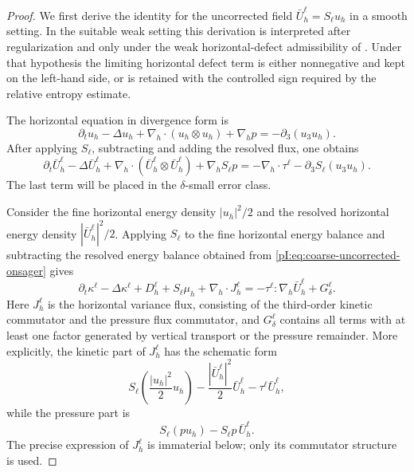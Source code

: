 \documentclass[11pt]{article}
\numberwithin{equation}{section}
\theoremstyle{plain}
\theoremstyle{definition}
\theoremstyle{remark}
\newcommand{\nabh}{\nabla_h}
\newcommand{\divh}{\nabla_h\!\cdot}
\begin{document}
\begin{proof}
We first derive the identity for the uncorrected field \(\bar U_h^\ell=S_\ell u_h\) in a smooth setting.  In the suitable weak setting this derivation is interpreted after regularization and only under the weak horizontal-defect admissibility of .  Under that hypothesis the limiting horizontal defect term is either nonnegative and kept on the left-hand side, or is retained with the controlled sign required by the relative entropy estimate.

The horizontal equation in divergence form is
\begin{equation}\label{pI:eq:horizontal-div-form-onsager}
        \partial_tu_h-
        \Delta u_h+
        \divh(u_h\otimes u_h)+\nabh p
        =-
        \partial_3(u_3u_h).
\end{equation}
After applying \(S_\ell\), subtracting and adding the resolved flux, one obtains
\begin{equation}\label{pI:eq:coarse-uncorrected-onsager}
        \partial_t\bar U_h^\ell-
        \Delta\bar U_h^\ell+
        \divh(\bar U_h^\ell\otimes\bar U_h^\ell)
        +\nabh S_\ell p
        =-
        \divh\tau^\ell-
        \partial_3S_\ell(u_3u_h).
\end{equation}
The last term will be placed in the \(\delta\)-small error class.

Consider the fine horizontal energy density \(|u_h|^2/2\) and the resolved horizontal energy density \(|\bar U_h^\ell|^2/2\).  Applying \(S_\ell\) to the fine horizontal energy balance and subtracting the resolved energy balance obtained from \eqref{pI:eq:coarse-uncorrected-onsager} gives
\begin{equation}\label{pI:eq:pointwise-horizontal-variance}
        \partial_t\kappa^\ell-
        \Delta\kappa^\ell+
        D_h^\ell+S_\ell\mu_h+
        \nabh\cdot J_h^\ell
        =-
        \tau^\ell:\nabh\bar U_h^\ell
        +G_\delta^\ell.
\end{equation}
Here \(J_h^\ell\) is the horizontal variance flux, consisting of the third-order kinetic commutator and the pressure flux commutator, and \(G_\delta^\ell\) contains all terms with at least one factor generated by vertical transport or the pressure remainder.  More explicitly, the kinetic part of \(J_h^\ell\) has the schematic form
\[
        S_\ell\left(\frac{|u_h|^2}{2}u_h\right)
        -\frac{|\bar U_h^\ell|^2}{2}\bar U_h^\ell
        -\tau^\ell\bar U_h^\ell,
\]
while the pressure part is
\[
        S_\ell(pu_h)-S_\ell p\,\bar U_h^\ell.
\]
The precise expression of \(J_h^\ell\) is immaterial below; only its commutator structure is used.


\end{proof}
\end{document}
